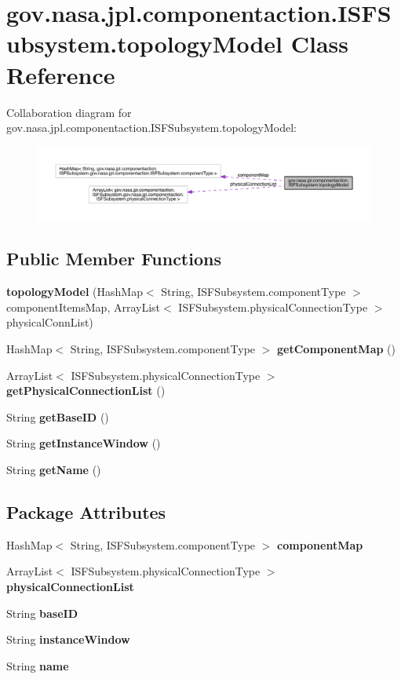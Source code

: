 \section{gov.\+nasa.\+jpl.\+componentaction.\+I\+S\+F\+Subsystem.\+topology\+Model Class Reference}
\label{classgov_1_1nasa_1_1jpl_1_1componentaction_1_1_i_s_f_subsystem_1_1topology_model}


Collaboration diagram for gov.\+nasa.\+jpl.\+componentaction.\+I\+S\+F\+Subsystem.\+topology\+Model\+:
\nopagebreak
\begin{figure}[H]
\begin{center}
\leavevmode
\includegraphics[width=350pt]{classgov_1_1nasa_1_1jpl_1_1componentaction_1_1_i_s_f_subsystem_1_1topology_model__coll__graph}
\end{center}
\end{figure}
\subsection*{Public Member Functions}
\begin{DoxyCompactItemize}
\item 
{\bf topology\+Model} (Hash\+Map$<$ String, I\+S\+F\+Subsystem.\+component\+Type $>$ component\+Items\+Map, Array\+List$<$ I\+S\+F\+Subsystem.\+physical\+Connection\+Type $>$ physical\+Conn\+List)
\item 
Hash\+Map$<$ String, I\+S\+F\+Subsystem.\+component\+Type $>$ {\bf get\+Component\+Map} ()
\item 
Array\+List$<$ I\+S\+F\+Subsystem.\+physical\+Connection\+Type $>$ {\bf get\+Physical\+Connection\+List} ()
\item 
String {\bf get\+Base\+ID} ()
\item 
String {\bf get\+Instance\+Window} ()
\item 
String {\bf get\+Name} ()
\end{DoxyCompactItemize}
\subsection*{Package Attributes}
\begin{DoxyCompactItemize}
\item 
Hash\+Map$<$ String, I\+S\+F\+Subsystem.\+component\+Type $>$ {\bf component\+Map}
\item 
Array\+List$<$ I\+S\+F\+Subsystem.\+physical\+Connection\+Type $>$ {\bf physical\+Connection\+List}
\item 
String {\bf base\+ID}
\item 
String {\bf instance\+Window}
\item 
String {\bf name}
\end{DoxyCompactItemize}


